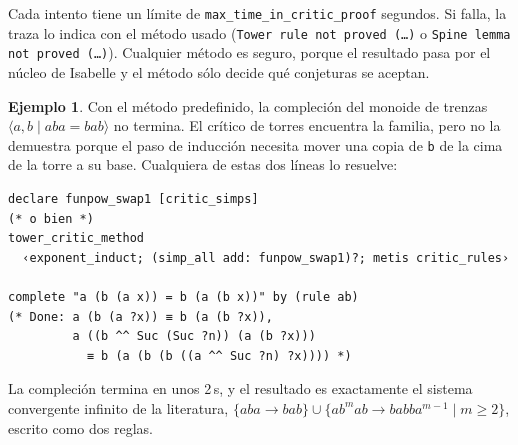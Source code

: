 \documentclass[11pt,a4paper]{article}
\newcommand{\isa}[1]{\texttt{#1}}
\newcommand{\rw}{\rightarrow}
\theoremstyle{definition}
\newtheorem{ejemplo}[definicion]{Ejemplo}
\theoremstyle{remark}
\begin{document}
Cada intento tiene un límite de \isa{max\_time\_in\_critic\_proof} segundos. Si
falla, la traza lo indica con el método usado (\isa{Tower rule not proved
(\ldots)} o \isa{Spine lemma not proved (\ldots)}). Cualquier método es seguro,
porque el resultado pasa por el núcleo de Isabelle y el método sólo decide qué
conjeturas se aceptan.

\begin{ejemplo}
Con el método predefinido, la compleción del monoide de trenzas
$\langle a, b \mid aba = bab\rangle$ no termina. El crítico de torres encuentra la familia,
pero no la demuestra porque el paso de inducción necesita mover una copia de
\isa{b} de la cima de la torre a su base. Cualquiera de estas dos líneas lo
resuelve:
\begin{lstlisting}
declare funpow_swap1 [critic_simps]
(* o bien *)
tower_critic_method
  ‹exponent_induct; (simp_all add: funpow_swap1)?; metis critic_rules›

complete "a (b (a x)) = b (a (b x))" by (rule ab)
(* Done: a (b (a ?x)) ≡ b (a (b ?x)),
         a ((b ^^ Suc (Suc ?n)) (a (b ?x)))
           ≡ b (a (b (b ((a ^^ Suc ?n) ?x)))) *)
\end{lstlisting}
La compleción termina en unos 2\,s, y el resultado es exactamente el sistema
convergente infinito de la literatura,
$\{aba \rw bab\} \cup \{ab^mab \rw babba^{m-1} \mid m \ge 2\}$, escrito como
dos reglas.
\end{ejemplo}
\end{document}
